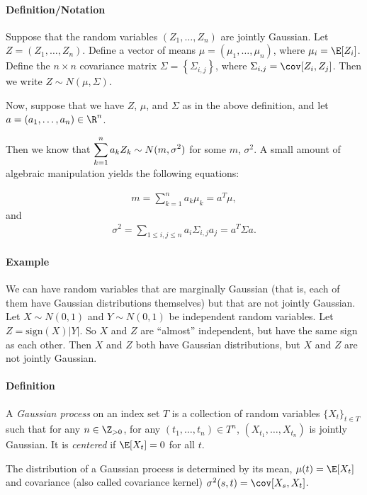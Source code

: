 \paragraph{Definition/Notation} Suppose that the random variables $(Z_1,\dots,Z_n)$ are jointly Gaussian.  
Let $Z=(Z_1,\dots,Z_n)$.  
Define a vector of means $\mu=(\mu_1, \ldots, \mu_n)$,
where $\mu_i = \E[Z_i]$.
Define the $n\times n$ covariance matrix 
$\Sigma=\left\{\Sigma_{i,j}\right\}$, where $\Sigma_{i,j}=\cov[Z_i,Z_j]$.  
Then we write $Z\sim N(\mu, \Sigma)$.

Now, suppose that we have $Z$, $\mu$, and $\Sigma$ as in the above definition, and let $a = (a_1,\dots,a_n) \in \R^n$.  

Then we know that $\displaystyle\sum_{k=1}^n a_kZ_k\sim N(m,\sigma^2)$ for some $m$, $\sigma^2$.  
A small amount of algebraic manipulation yields the following equations:

$$\begin{aligned}
    m=\sum_{k=1}^n a_k\mu_k=a^T\mu,
\end{aligned}$$
and 
$$\begin{aligned}
    \sigma^2=\sum_{1\leq i,j\leq n} a_i\Sigma_{i,j}a_j=a^T\Sigma a.
\end{aligned}$$


\paragraph{Example} 
We can have random variables that are marginally Gaussian (that is, each of them have Gaussian distributions themselves) but that are not jointly Gaussian.  
Let $X\sim N(0,1)$ and $Y\sim N(0,1)$ be independent random variables.  
Let $Z=\mathrm{sign}(X)|Y|$.  
So $X$ and $Z$ are ``almost'' independent, but have the same sign as each other.  
Then $X$ and $Z$ both have Gaussian distributions, but $X$ and $Z$ are not jointly Gaussian.

\paragraph{Definition} 
A \emph{Gaussian process} on an index set $T$ is a collection of random variables $\{X_t\}_{t\in T}$ 
such that for any $n\in\Z_{>0}$, for any $(t_1,\dots,t_n)\in T^n$, $(X_{t_1},\dots,X_{t_n})$ is jointly Gaussian.  
It is \emph{centered} if $\E[X_t]=0$ for all $t$.

The distribution of a Gaussian process is determined 
by its mean, $\mu(t)=\E[X_t]$ and covariance (also called covariance kernel) $\sigma^2(s,t)=\cov[X_s,X_t]$.

